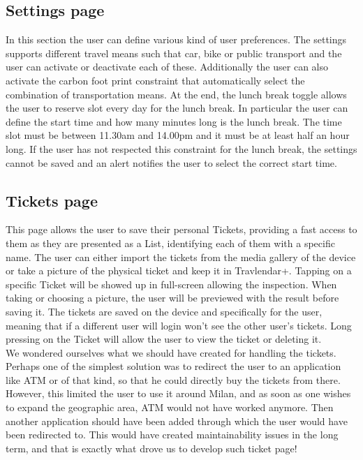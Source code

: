 \subsection*{Settings page}
In this section the user can define various kind of user preferences. The settings supports different travel means such that car, bike or public transport and the user can activate or deactivate each of these. Additionally the user can also activate the carbon foot print constraint that automatically select the combination of transportation means. At the end, the lunch break toggle allows the user to reserve slot every day for the lunch break. In particular the user can define the start time and how many minutes long is the lunch break. The time slot must be between 11.30am and 14.00pm and it must be at least half an hour long. If the user has not respected this constraint for the lunch break, the settings cannot be saved and an alert notifies the user to select the correct start time.

\subsection*{Tickets page}
This page allows the user to save their personal Tickets, providing a fast access to them as they are presented as a List, identifying each of them with a specific name. The user can either import the tickets from the media gallery of the device or take a picture of the physical ticket and keep it in Travlendar+. Tapping on a specific Ticket will be showed up in full-screen allowing the inspection. When taking or choosing a picture, the user will be previewed with the result before saving it.  The tickets are saved on the device and specifically for the user, meaning that if a different user will login won't see the other user's tickets.
Long pressing on the Ticket will allow the user to view the ticket or deleting it. \\

We wondered ourselves what we should have created for handling the tickets. Perhaps one of the simplest solution was to redirect the user to an application like ATM or of that kind, so that he could directly buy the tickets from there. However, this limited the user to use it around Milan, and as soon as one wishes to expand the geographic area, ATM would not have worked anymore. Then another application should have been added through which the user would have been redirected to. This would have created maintainability issues in the long term, and that is exactly what drove us to develop such ticket page!







